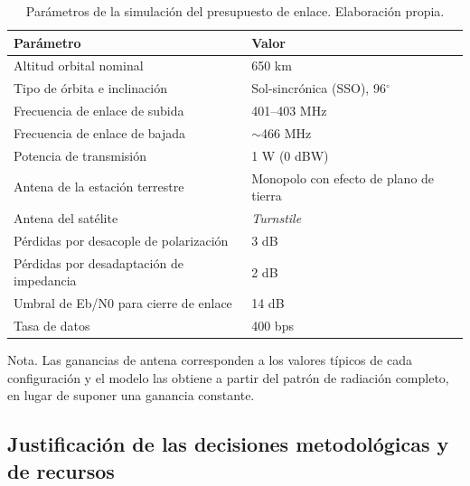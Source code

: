 \begin{table}[H]
\centering
\begin{threeparttable}
\caption{Parámetros de la simulación del presupuesto de enlace. Elaboración propia.\vspace{1ex}}
\label{tab:linkbudget}
\small
\begin{tabularx}{\textwidth}{|@{\hspace{4pt}}X l@{\hspace{4pt}}|}
\toprule
\textbf{Parámetro} & \textbf{Valor} \\
\midrule
Altitud orbital nominal                       & 650 km \\
Tipo de órbita e inclinación                  & Sol-sincrónica (SSO), 96$^{\circ}$ \\
Frecuencia de enlace de subida                & 401--403 MHz \\
Frecuencia de enlace de bajada                & $\sim$466 MHz \\
Potencia de transmisión                       & 1 W (0 dBW) \\
Antena de la estación terrestre               & Monopolo con efecto de plano de tierra \\
Antena del satélite                           & \textit{Turnstile} \\
Pérdidas por desacople de polarización        & 3 dB \\
Pérdidas por desadaptación de impedancia      & 2 dB \\
Umbral de Eb/N0 para cierre de enlace         & 14 dB \\
Tasa de datos                                 & 400 bps \\
\bottomrule
\end{tabularx}
\begin{tablenotes}[flushleft]\footnotesize
\item Nota. Las ganancias de antena corresponden a los valores típicos de cada configuración y el modelo las obtiene a partir del patrón de radiación completo, en lugar de suponer una ganancia constante.
\end{tablenotes}
\end{threeparttable}
\end{table}



\subsection{Justificación de las decisiones metodológicas y de recursos}

